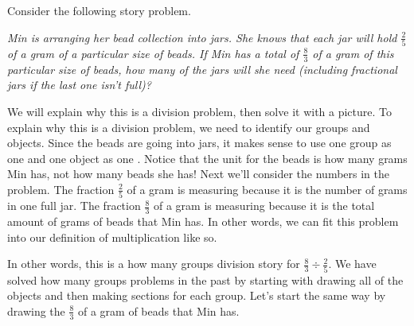 \documentclass{ximera}
\begin{document}
\begin{example}
Consider the following story problem. 

\emph{Min is arranging her bead collection into jars. She knows that each jar will hold $\frac{2}{5}$ of a gram of a particular size of beads. If Min has a total of $\frac{8}{3}$ of a gram of this particular size of beads, how many of the jars will she need (including fractional jars if the last one isn't full)?}

We will explain why this is a division problem, then solve it with a picture. To explain why this is a division problem, we need to identify our groups and objects. Since the beads are going into jars, it makes sense to use one group as one  and one object as one . Notice that the unit for the beads is how many grams Min has, not how many beads she has! Next we'll consider the numbers in the problem. The fraction $\frac{2}{5}$ of a gram is measuring  because it is the number of grams in one full jar. The fraction $\frac{8}{3}$ of a gram is measuring  because it is the total amount of grams of beads that Min has. In other words, we can fit this problem into our definition of multiplication like so.

\begin{image}
\end{image}
In other words, this is a  how many groups division story for $\frac{8}{3} \div \frac{2}{5}$. We have solved how many groups problems in the past by starting with drawing all of the objects and then making sections for each group. Let's start the same way by drawing the $\frac{8}{3}$ of a gram of beads that Min has.


\end{example}
\end{document}

